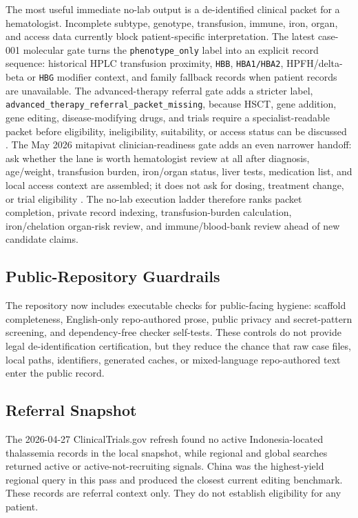 The most useful immediate no-lab output is a de-identified clinical packet for a
hematologist. Incomplete subtype, genotype, transfusion, immune, iron, organ,
and access data currently block patient-specific interpretation. The latest
case-001 molecular gate turns the \texttt{phenotype\_only} label into an
explicit record sequence: historical HPLC transfusion proximity,
\texttt{HBB}, \texttt{HBA1/HBA2}, HPFH/delta-beta or \texttt{HBG} modifier
context, and family fallback records when patient records are unavailable.
The advanced-therapy referral gate adds a stricter label,
\texttt{advanced\_therapy\_referral\_packet\_missing}, because HSCT,
gene addition, gene editing, disease-modifying drugs, and trials require a
specialist-readable packet before eligibility, ineligibility, suitability, or
access status can be discussed
\cite{pinto2025tifHsct,locatelli2025tifGeneManipulation,fda2022zynteglo,fda2026casgevy,nice2024exacel}.
The May 2026 mitapivat clinician-readiness gate adds an even narrower handoff:
ask whether the lane is worth hematologist review at all after diagnosis,
age/weight, transfusion burden, iron/organ status, liver tests, medication
list, and local access context are assembled; it does not ask for dosing,
treatment change, or trial eligibility
\cite{fda2025aqvesme,clinicaltrials2026energizeT,clinicaltrials2026mitapivatPediatricTdt,clinicaltrials2026mitapivatPediatricNtdt}.
The no-lab execution ladder therefore ranks packet completion, private record
indexing, transfusion-burden calculation, iron/chelation organ-risk review,
and immune/blood-bank review ahead of new candidate claims.



\subsection{Public-Repository Guardrails}

The repository now includes executable checks for public-facing hygiene:
scaffold completeness, English-only repo-authored prose, public privacy and
secret-pattern screening, and dependency-free checker self-tests. These controls
do not provide legal de-identification certification, but they reduce the chance
that raw case files, local paths, identifiers, generated caches, or mixed-language
repo-authored text enter the public record.

\subsection{Referral Snapshot}

The 2026-04-27 ClinicalTrials.gov refresh found no active Indonesia-located
thalassemia records in the local snapshot, while regional and global searches
returned active or active-not-recruiting signals. China was the highest-yield
regional query in this pass and produced the closest current editing benchmark.
These records are referral context only. They do not establish eligibility for
any patient.


